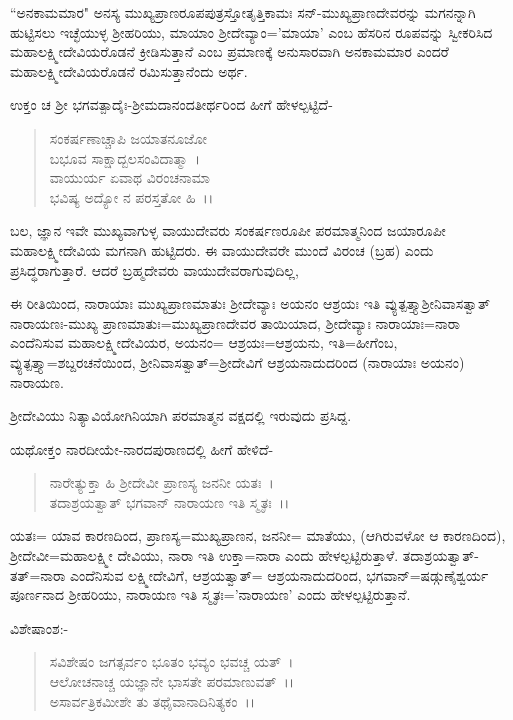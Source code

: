 ``ಅನಕಾಮಮಾರ" ಅನಸ್ಯ ಮುಖ್ಯಪ್ರಾಣರೂಪಪುತ್ರಸ್ತೋತೃತ್ತಿಕಾಮಃ ಸನ್-ಮುಖ್ಯಪ್ರಾಣದೇವರನ್ನು ಮಗನನ್ನಾಗಿ ಹುಟ್ಟಿಸಲು ಇಚ್ಛೆಯುಳ್ಳ ಶ‍್ರೀಹರಿಯು, ಮಾಯಾಂ ಶ‍್ರೀದೇವ್ಯಾಂ='ಮಾಯಾ' ಎಂಬ ಹೆಸರಿನ ರೂಪವನ್ನು ಸ್ವೀಕರಿಸಿದ ಮಹಾಲಕ್ಷ್ಮೀದೇವಿಯರೊಡನೆ ಕ್ರೀಡಿಸುತ್ತಾನೆ ಎಂಬ ಪ್ರಮಾಣಕ್ಕೆ ಅನುಸಾರವಾಗಿ ಅನಕಾಮಮಾರ ಎಂದರೆ ಮಹಾಲಕ್ಷ್ಮೀದೇವಿಯರೊಡನೆ ರಮಿಸುತ್ತಾನೆಂದು ಅರ್ಥ.

ಉಕ್ತಂ ಚ ಶ‍್ರೀ ಭಗವತ್ಪಾದೈಃ-ಶ‍್ರೀಮದಾನಂದತೀರ್ಥರಿಂದ ಹೀಗೆ ಹೇಳಲ್ಪಟ್ಟಿದೆ-

\begin{verse}
ಸಂಕರ್ಷಣಾಚ್ಚಾಪಿ ಜಯಾತನೂಜೋ\\ ಬಭೂವ ಸಾಕ್ಷಾದ್ಬಲಸಂವಿದಾತ್ಮಾ~।\\ ವಾಯುರ್ಯ ಏವಾಥ ವಿರಂಚನಾಮಾ\\ ಭವಿಷ್ಯ ಅದ್ಯೋ ನ ಪರಸ್ತತೋ ಹಿ~।।
\end{verse}

\noindent
ಬಲ, ಜ್ಞಾನ ಇವೇ ಮುಖ್ಯವಾಗುಳ್ಳ ವಾಯುದೇವರು ಸಂಕರ್ಷಣರೂಪೀ ಪರಮಾತ್ಮನಿಂದ ಜಯಾರೂಪೀ ಮಹಾಲಕ್ಷ್ಮೀದೇವಿಯ ಮಗನಾಗಿ ಹುಟ್ಟಿದರು. ಈ ವಾಯುದೇವರೇ ಮುಂದೆ ವಿರಂಚ (ಬ್ರಹ) ಎಂದು ಪ್ರಸಿದ್ಧರಾಗುತ್ತಾರೆ. ಆದರೆ ಬ್ರಹ್ಮದೇವರು ವಾಯುದೇವರಾಗುವುದಿಲ್ಲ,

ಈ ರೀತಿಯಿಂದ, ನಾರಾಯಾಃ ಮುಖ್ಯಪ್ರಾಣಮಾತುಃ ಶ‍್ರೀದೇವ್ಯಾಃ ಅಯನಂ ಆಶ್ರಯಃ ಇತಿ ವ್ಯುತ್ಪತ್ತ್ಯಾಶ‍್ರೀನಿವಾಸತ್ವಾತ್ ನಾರಾಯಣಃ-ಮುಖ್ಯ ಪ್ರಾಣಮಾತುಃ=ಮುಖ್ಯಪ್ರಾಣದೇವರ ತಾಯಿಯಾದ, ಶ‍್ರೀದೇವ್ಯಾಃ ನಾರಾಯಾಃ=ನಾರಾ ಎಂದೆನಿಸುವ ಮಹಾಲಕ್ಷ್ಮೀದೇವಿಯರ, ಅಯನಂ= ಆಶ್ರಯಃ=ಆಶ್ರಯನು, ಇತಿ=ಹೀಗೆಂಬ, ವ್ಯುತ್ಪತ್ತ್ಯಾ=ಶಬ್ದರಚನೆಯಿಂದ, ಶ‍್ರೀನಿವಾಸತ್ವಾತ್=ಶ‍್ರೀದೇವಿಗೆ ಆಶ್ರಯನಾದುದರಿಂದ (ನಾರಾಯಾಃ ಅಯನಂ) ನಾರಾಯಣ.

ಶ‍್ರೀದೇವಿಯು ನಿತ್ಯಾವಿಯೋಗಿನಿಯಾಗಿ ಪರಮಾತ್ಮನ ವಕ್ಷದಲ್ಲಿ ಇರುವುದು ಪ್ರಸಿದ್ದ.

ಯಥೋಕ್ತಂ ನಾರದೀಯೇ-ನಾರದಪುರಾಣದಲ್ಲಿ ಹೀಗೆ ಹೇಳಿದೆ-

\begin{verse}
ನಾರೇತ್ಯುಕ್ತಾ ಹಿ ಶ‍್ರೀದೇವೀ ಪ್ರಾಣಸ್ಯ ಜನನೀ ಯತಃ~।\\ ತದಾಶ್ರಯತ್ವಾತ್ ಭಗವಾನ್ ನಾರಾಯಣ ಇತಿ ಸ್ಮೃತಃ~।।
\end{verse}

\noindent
ಯತಃ= ಯಾವ ಕಾರಣದಿಂದ, ಪ್ರಾಣಸ್ಯ=ಮುಖ್ಯಪ್ರಾಣನ, ಜನನೀ= ಮಾತೆಯು, (ಆಗಿರುವಳೋ ಆ ಕಾರಣದಿಂದ), ಶ‍್ರೀದೇವೀ=ಮಹಾಲಕ್ಷ್ಮೀ ದೇವಿಯು, ನಾರಾ ಇತಿ ಉಕ್ತಾ=ನಾರಾ ಎಂದು ಹೇಳಲ್ಪಟ್ಟಿರುತ್ತಾಳೆ. ತದಾಶ್ರಯತ್ವಾತ್-ತತ್=ನಾರಾ ಎಂದೆನಿಸುವ ಲಕ್ಷ್ಮೀದೇವಿಗೆ, ಆಶ್ರಯತ್ವಾತ್= ಆಶ್ರಯನಾದುದರಿಂದ, ಭಗವಾನ್=ಷಡ್ಗುಣೈಶ್ವರ್ಯ ಪೂರ್ಣನಾದ ಶ‍್ರೀಹರಿಯು, ನಾರಾಯಣ ಇತಿ ಸ್ಮೃತಃ='ನಾರಾಯಣ' ಎಂದು ಹೇಳಲ್ಪಟ್ಟಿರುತ್ತಾನೆ.

ವಿಶೇಷಾಂಶ:-

\begin{verse}
ಸವಿಶೇಷಂ ಜಗತ್ಸರ್ವಂ ಭೂತಂ ಭವ್ಯಂ ಭವಚ್ಚ ಯತ್~।\\ ಆಲೋಚನಾಚ್ಚ ಯಜ್ಞಾನೇ ಭಾಸತೇ ಪರಮಾಣುವತ್~।।\\ ಅಸಾರ್ವತ್ರಿಕಮೀಶೇ ತು ತಥೈವಾನಾದಿನಿತ್ಯಕಂ~।।
\end{verse}

